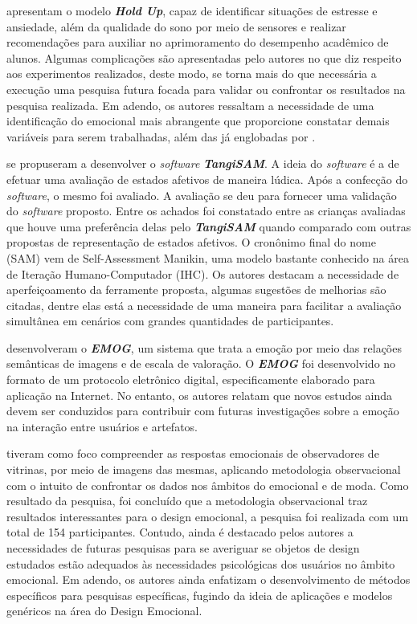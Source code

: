 \documentclass[12pt]{article}
\begin{document}
 apresentam o modelo \textit{\textbf{Hold Up}}, capaz de identificar situações de estresse e ansiedade, além da qualidade do sono por meio de sensores e realizar recomendações para auxiliar no aprimoramento do desempenho acadêmico de alunos. Algumas complicações são apresentadas pelo autores no que diz respeito aos experimentos realizados, deste modo, se torna mais do que necessária a execução uma pesquisa futura focada para validar ou confrontar os resultados na pesquisa realizada. Em adendo, os autores ressaltam a necessidade de uma identificação do emocional mais abrangente que proporcione constatar demais variáveis para serem trabalhadas, além das já englobadas por .

 se propuseram a desenvolver o \textit{software} \textit{\textbf{TangiSAM}}. A ideia do \textit{software} é a de efetuar uma avaliação de estados afetivos de maneira lúdica. Após a confecção do \textit{software}, o mesmo foi avaliado. A avaliação se deu para fornecer uma validação do \textit{software} proposto. Entre os achados foi constatado entre as crianças avaliadas que houve uma preferência delas pelo \textit{\textbf{TangiSAM}} quando comparado com outras propostas de representação de estados afetivos. O cronônimo final do nome (SAM) vem de Self-Assessment Manikin, uma modelo bastante conhecido na área de Iteração Humano-Computador (IHC). Os autores destacam a necessidade de aperfeiçoamento da ferramente proposta, algumas sugestões de melhorias são citadas, dentre elas está a necessidade de uma maneira para facilitar a avaliação simultânea em cenários com grandes quantidades de participantes. 

 desenvolveram o \textit{\textbf{EMOG}}, um sistema que trata a emoção por meio das relações semânticas de imagens e de escala de valoração. O \textit{\textbf{EMOG}} foi desenvolvido   no   formato   de   um   protocolo   eletrônico   digital, especificamente  elaborado  para  aplicação  na  Internet. No entanto, os autores relatam que novos estudos ainda devem ser conduzidos para contribuir com futuras investigações sobre a emoção na interação entre usuários e artefatos.

 tiveram como foco compreender as respostas emocionais de observadores de vitrinas, por meio de imagens das mesmas, aplicando metodologia observacional com o intuito de confrontar os dados nos âmbitos do emocional e de moda. Como resultado da pesquisa, foi concluído que a metodologia observacional traz resultados interessantes para o design emocional, a pesquisa foi realizada com um total de 154 participantes. Contudo, ainda é destacado pelos autores a necessidades de futuras pesquisas para se averiguar se objetos de design estudados estão adequados às necessidades psicológicas dos usuários no âmbito emocional. Em adendo, os autores ainda enfatizam o desenvolvimento de métodos específicos para pesquisas específicas, fugindo da ideia de aplicações e modelos genéricos na área do Design Emocional.
\end{document}
